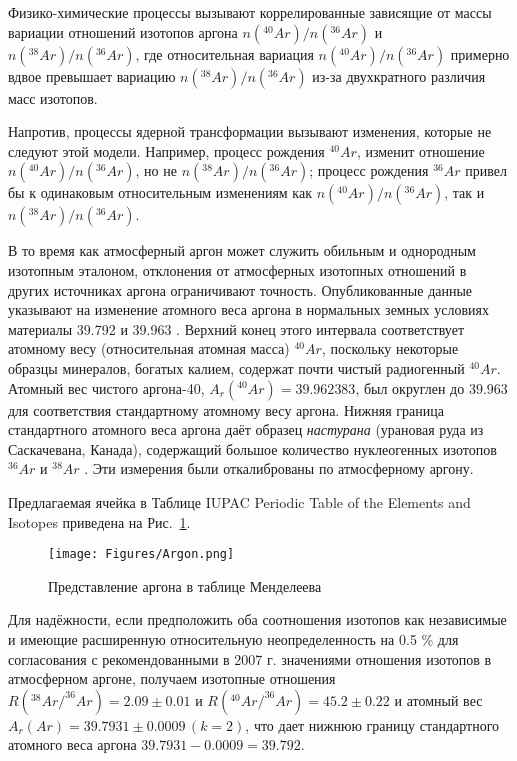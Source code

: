 \documentclass[a5paper,openany]{book}
\begin{document}
Физико-химические процессы вызывают
коррелированные зависящие от массы вариации отношений изотопов аргона $n(^{40}Ar)/n(^{36}Ar)$ и $n(^{38}Ar)/n(^{36}Ar)$,
где относительная вариация $n(^{40}Ar)/n(^{36}Ar)$ примерно вдвое превышает вариацию $n(^{38}Ar)/n(^{36}Ar)$ из-за
двухкратного различия масс изотопов. 

Напротив, процессы ядерной трансформации вызывают изменения, которые не следуют этой модели. Например, процесс рождения $^{40}Ar$, изменит отношение $n(^{40}Ar)/n(^{36}Ar)$, но не $n(^{38}Ar)/n(^{36}Ar)$; процесс рождения $^{36}Ar$ привел бы к одинаковым относительным изменениям как $n(^{40}Ar)/n(^{36}Ar)$, так и $n(^{38}Ar)/n(^{36}Ar)$.



В то время как атмосферный аргон может служить обильным и однородным изотопным эталоном, отклонения от
атмосферных изотопных отношений в других источниках аргона ограничивают точность. Опубликованные данные указывают на изменение атомного веса аргона в нормальных земных условиях
материалы 39.792 и 39.963 \cite{IUPACArgon}. Верхний конец этого интервала соответствует атомному весу
(относительная атомная масса) $^{40}Ar$, поскольку некоторые образцы минералов, богатых калием, содержат почти чистый радиогенный $^{40}Ar$. Атомный вес чистого аргона-40, $A_r(^{40}Ar) = 39.962 383$, был округлен до $39.963$ для соответствия стандартному атомному весу аргона. Нижняя граница стандартного атомного веса аргона даёт образец \emph{настурана}  (урановая руда из Саскачевана, Канада), содержащий большое количество нуклеогенных изотопов 
$^{36}Ar$ и $^{38}Ar$ \cite{Argon1993}. Эти измерения были откалиброваны по атмосферному аргону.

Предлагаемая ячейка в Таблице IUPAC Periodic Table of the Elements and Isotopes \cite{IPTEI} приведена на Рис.~\ref{f:Argon}.

\begin{figure}[ht] 
	\centering\small
	\texttt{[image: Figures/Argon.png]}
	\caption{Представление аргона в таблице Менделеева} 
	\label{f:Argon}
\end{figure}

Для надёжности, если предположить
оба соотношения изотопов как независимые и имеющие расширенную относительную неопределенность на 0.5 \% для согласования с  рекомендованными в 2007 г. значениями отношения изотопов в атмосферном аргоне, получаем изотопные
отношения $R(^{38}Ar/^{36}Ar) = 2.09 \pm 0.01$ и $R(^{40}Ar/^{36}Ar) = 45.2 \pm 0.22$ и атомный вес
$A_r(Ar) = 39.7931 \pm 0.0009 \, (k = 2)$, что дает нижнюю границу стандартного атомного веса аргона $39.7931 - 0.0009 = 39.792$. 
\end{document}
